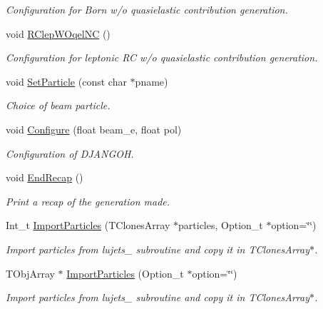 \begin{DoxyCompactItemize}
\begin{DoxyCompactList}\small\item\em Configuration for Born w/o quasielastic contribution generation. \end{DoxyCompactList}\item 
void \hyperlink{class_t_djangoh_a283b09ffc625a6a14af2f301ae957c92}{R\+Clep\+W\+Oqel\+NC} ()
\begin{DoxyCompactList}\small\item\em Configuration for leptonic RC w/o quasielastic contribution generation. \end{DoxyCompactList}\item 
void \hyperlink{class_t_djangoh_a90712a2b5457a05ffb78faca2cc3a2b9}{Set\+Particle} (const char $\ast$pname)
\begin{DoxyCompactList}\small\item\em Choice of beam particle. \end{DoxyCompactList}\item 
void \hyperlink{class_t_djangoh_af58a4c6bb944a4ce79cc538829e490e8}{Configure} (float beam\+\_\+e, float pol)
\begin{DoxyCompactList}\small\item\em Configuration of D\+J\+A\+N\+G\+OH. \end{DoxyCompactList}\item 
void \hyperlink{class_t_djangoh_a076cac82063ed8740ac0a32e77c02c94}{End\+Recap} ()
\begin{DoxyCompactList}\small\item\em Print a recap of the generation made. \end{DoxyCompactList}\item 
Int\+\_\+t \hyperlink{class_t_djangoh_a69e5ebe63faa2dd00d9bcd217ecdf825}{Import\+Particles} (T\+Clones\+Array $\ast$particles, Option\+\_\+t $\ast$option=\char`\"{}\char`\"{})
\begin{DoxyCompactList}\small\item\em Import particles from lujets\+\_\+ subroutine and copy it in T\+Clones\+Array$\ast$. \end{DoxyCompactList}\item 
T\+Obj\+Array $\ast$ \hyperlink{class_t_djangoh_ac63f2c463b6a2fff98f256952aaf945f}{Import\+Particles} (Option\+\_\+t $\ast$option=\char`\"{}\char`\"{})
\begin{DoxyCompactList}\small\item\em Import particles from lujets\+\_\+ subroutine and copy it in T\+Clones\+Array$\ast$. \end{DoxyCompactList}\item 

\end{DoxyCompactItemize}
